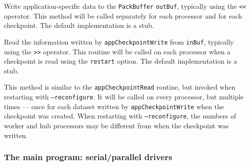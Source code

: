 Write application-specific data to the \texttt{PackBuffer}
  \texttt{outBuf}, typically using the \texttt{<<} operator.  This method
  will be called separately for each processor and for each
  checkpoint.  The default implementation is a stub.

Read the information written by \texttt{appCheckpointWrite} from
\texttt{inBuf}, typically using the \texttt{>>} operator.  This
routine will be called on each processor when a checkpoint is read
using the \texttt{restart} option.  The default implementation is a stub.

This method is similar to the \texttt{appCheckpointRead}
routine, but invoked when restarting with \texttt{--reconfigure}.  It
will be called on every processor, but multiple times --- once for
each dataset written by \texttt{appCheckpointWrite} when the
checkpoint was created.  When restarting with \texttt{--reconfigure},
the numbers of worker and hub processors may be different from when the
checkpoint was written.

\subsubsection{The main program: serial/parallel drivers}

